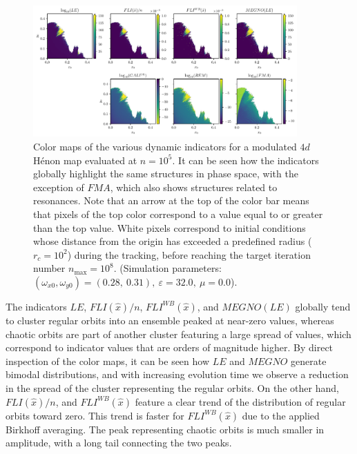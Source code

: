 \begin{figure}[htp]
    \centering
    \includegraphics[width=0.9\textwidth]{6_dynamic_indicators/figs/overview.pdf}
    \caption{Color maps of the various dynamic indicators for a modulated $4d$ Hénon map evaluated at $n=10^5$. It can be seen how the indicators globally highlight the same structures in phase space, with the exception of $FMA$, which also shows structures related to resonances. Note that an arrow at the top of the color bar means that pixels of the top color correspond to a value equal to or greater than the top value. White pixels correspond to initial conditions whose distance from the origin has exceeded a predefined radius ($r_c=10^2$) during the tracking, before reaching the target iteration number $n_\text{max}=10^8$. (Simulation parameters: $(\omega_{x0},\omega_{y0})= (0.28,\ 0.31),\ \varepsilon=32.0,\ \mu=0.0$).}
    \label{fig:generic_example}
\end{figure}

The indicators $LE$, $FLI(\hat{x})/n$, $FLI^{WB}(\hat{x})$, and $MEGNO(LE)$ globally tend to cluster regular orbits into an ensemble peaked at near-zero values, whereas chaotic orbits are part of another cluster featuring a large spread of values, which correspond to indicator values that are orders of magnitude higher. By direct inspection of the color maps, it can be seen how $LE$ and $MEGNO$ generate bimodal distributions, and with increasing evolution time we observe a reduction in the spread of the cluster representing the regular orbits. On the other hand, $FLI(\hat{x})/n$, and $FLI^{WB}(\hat{x})$ feature a clear trend of the distribution of regular orbits toward zero. This trend is faster for $FLI^{WB}(\hat{x})$ due to the applied Birkhoff averaging. The peak representing chaotic orbits is much smaller in amplitude, with a long tail connecting the two peaks.


